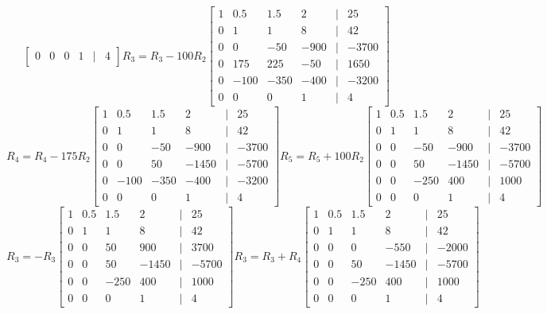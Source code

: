 \documentclass[11pt]{article}
\begin{document}
\begin{enumerate}
\begin{enumerate}
\[\begin{bmatrix}
    0 & 0 & 0 & 1 &|& 4
\end{bmatrix}
R_3 = R_3 - 100R_2
\begin{bmatrix}
    1 & 0.5 & 1.5 & 2 &|& 25 \\
    0 & 1 & 1 & 8 &|& 42 \\
    0 & 0 & -50 & -900 &|& -3700 \\
    0 & 175 & 225 & -50 &|& 1650 \\
    0 & -100 & -350 & -400 &|& -3200\\
    0 & 0 & 0 & 1 &|& 4
\end{bmatrix}
\]
\[
R_4 = R_4 - 175R_2
\begin{bmatrix}
    1 & 0.5 & 1.5 & 2 &|& 25 \\
    0 & 1 & 1 & 8 &|& 42 \\
    0 & 0 & -50 & -900 &|& -3700 \\
    0 & 0 & 50 & -1450 &|& -5700 \\
    0 & -100 & -350 & -400 &|& -3200\\
    0 & 0 & 0 & 1 &|& 4
\end{bmatrix}
R_5 = R_5 + 100R_2
\begin{bmatrix}
    1 & 0.5 & 1.5 & 2 &|& 25 \\
    0 & 1 & 1 & 8 &|& 42 \\
    0 & 0 & -50 & -900 &|& -3700 \\
    0 & 0 & 50 & -1450 &|& -5700 \\
    0 & 0 & -250 & 400 &|& 1000\\
    0 & 0 & 0 & 1 &|& 4
\end{bmatrix}
\]
\[
R_3 = -R_3
\begin{bmatrix}
    1 & 0.5 & 1.5 & 2 &|& 25 \\
    0 & 1 & 1 & 8 &|& 42 \\
    0 & 0 & 50 & 900 &|& 3700 \\
    0 & 0 & 50 & -1450 &|& -5700 \\
    0 & 0 & -250 & 400 &|& 1000\\
    0 & 0 & 0 & 1 &|& 4
\end{bmatrix}
R_3 = R_3 + R_4
\begin{bmatrix}
    1 & 0.5 & 1.5 & 2 &|& 25 \\
    0 & 1 & 1 & 8 &|& 42 \\
    0 & 0 & 0 & -550 &|& -2000 \\
    0 & 0 & 50 & -1450 &|& -5700 \\
    0 & 0 & -250 & 400 &|& 1000\\
    0 & 0 & 0 & 1 &|& 4
\end{bmatrix}
\]


\end{enumerate}
\end{enumerate}
\end{document}
